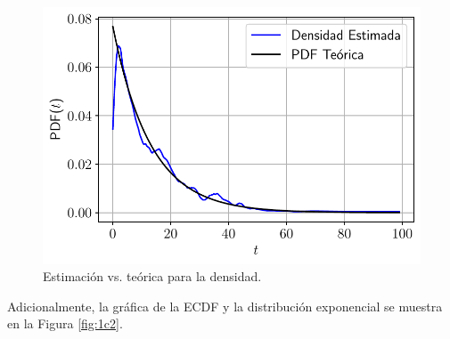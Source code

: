 \documentclass[fleqn]{article}
\begin{document}
\begin{figure}[H]
    \centering
    \includegraphics[scale=.6]{1c_2.pdf}
    \caption{Estimación vs. teórica para la densidad.}
    \label{fig:1c1}
\end{figure}

Adicionalmente, la gráfica de la ECDF y la distribución exponencial se muestra en la Figura \ref{fig:1c2}.
\end{document}
